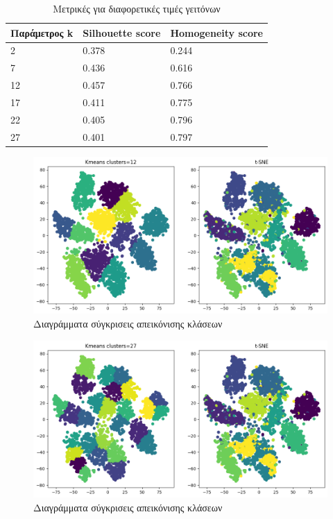 \begin{table}[ht]
	\centering
	\caption{Μετρικές για διαφορετικές τιμές γειτόνων}
	\begin{tabular}{l | l | l}
		Παράμετρος k & Silhouette score &  Homogeneity score\\
		\hline
		2 & 0.378 & 0.244\\
		7 & 0.436 & 0.616\\
		12 & 0.457&0.766\\
		17 & 0.411 & 0.775\\
		22 &0.405 & 0.796\\
		27 & 0.401 & 0.797\\
	\end{tabular}
	
	\label{tab:abc1}
\end{table}
\begin{figure}[ht]
	\centering
	\includegraphics[width=1\linewidth]{Imagedata1/k_12tsne.png}
	\caption{ Διαγράμματα σύγκρισεις απεικόνισης κλάσεων }
	\label{f:g5}	
\end{figure}
\begin{figure}[ht]
	\centering
	\includegraphics[width=1\linewidth]{Imagedata1/k_27tsne.png}
	\caption{ Διαγράμματα σύγκρισεις απεικόνισης κλάσεων }
	\label{f:g6}	
\end{figure}
\clearpage

